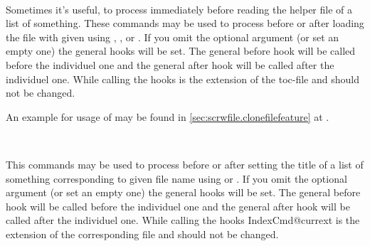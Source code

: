 \begin{Declaration}
  \\
\end{Declaration}
%
%
Sometimes it's useful, to process  immediately before
reading the helper file of a list of something.
These commands
may be used to process  before or after loading the file
with given  using , , or
.  If you omit the optional argument (or set an empty
one) the general hooks will be set. The general before hook will be called
before the individuel one and the general after hook will be called after the
individuel one. While calling the hooks
 is the
extension of the toc-file and should not be changed.

An example for usage of  may be
found in \autoref{sec:scrwfile.clonefilefeature} at
.
%
%

\begin{Declaration}
  \\
\end{Declaration}
%
%
This commands may be used to process  before or after
setting the title of a list of something corresponding to given file name
 using  or . If you omit
the optional argument (or set an empty one) the general hooks will be set. The
general before hook will be called before the individuel one and the general
after hook will be called after the individuel one. While calling the hooks
IndexCmd{@currext} is the
extension of the corresponding file and should not be changed.
%
%

